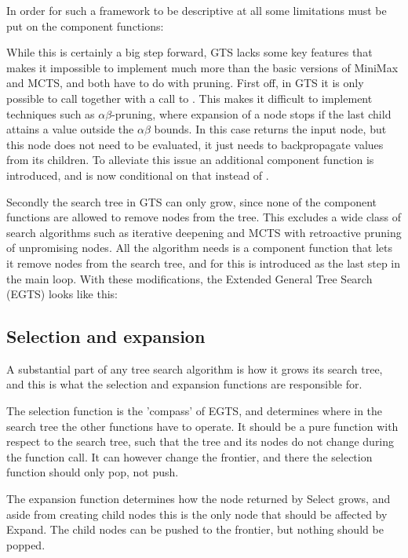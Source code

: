 In order for such a framework to be descriptive at all some limitations
must be put on the component functions: 

While this is certainly a big step forward, GTS lacks some key features
that makes it impossible to implement much more than the basic versions
of MiniMax and MCTS, and both have to do with pruning. First off, in 
GTS it is only possible to call \bp together with a call to \eval. This
makes it difficult to implement techniques such as $\alpha\beta$-pruning,
where expansion of a node stops if the last child attains a value outside
the $\alpha\beta$ bounds. In this case \expand returns the input node,
but this node does not need to be evaluated, it just needs to
backpropagate values from its children. To alleviate this issue an
additional component function \shbp is introduced, and \bp is now
conditional on that instead of \sheval.

Secondly the search tree in GTS can only grow, since none of the
component functions are allowed to remove nodes from the tree. This
excludes a wide class of search algorithms such as iterative deepening
and MCTS with retroactive pruning of unpromising nodes. All the
algorithm needs is a component function that lets it remove nodes
from the search tree, and for this  is introduced as the
last step in the main loop. With these modifications, the Extended
General Tree Search (EGTS) looks like this:



% 


\subsection{Selection and expansion}

A substantial part of any tree search algorithm is how it grows its
search tree, and this is what the selection and expansion functions
are responsible for.

The selection function is the 'compass' of EGTS, and determines where in
the search tree the other functions have to operate. It should be a
pure function with respect to the search tree, such that the tree
and its nodes do not change during the function call. It can however 
change the frontier, and there the selection function should only pop, 
not push.

The expansion function determines how the node returned by Select
grows, and aside from creating child nodes this is the only node that
should be affected by Expand. The child nodes can be pushed to the
frontier, but nothing should be popped.

